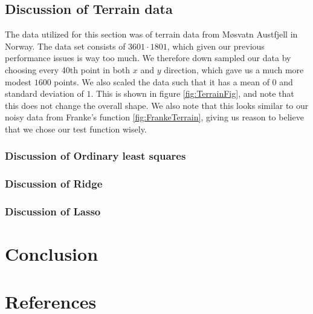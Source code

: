 \documentclass{article}
\begin{document}
\subsection{Discussion of Terrain data}
The data utilized for this section was of terrain data from Møsvatn Austfjell in Norway. The data set consists of $3601 \cdot 1801$, which given our previous performance issues is way too much. We therefore down sampled our data by choosing every 40th point in both $x$ and $y$ direction, which gave us a much more modest $1600$ points. We also scaled the data such that it has a mean of $0$ and standard deviation of $1$. This is shown in figure \ref{fig:TerrainFig}, and note that this does not change the overall shape. We also note that this looks similar to our noisy data from Franke's function \ref{fig:FrankeTerrain}, giving us reason to believe that we chose our test function wisely.

\subsubsection{Discussion of Ordinary least squares}


\subsubsection{Discussion of Ridge}
\subsubsection{Discussion of Lasso}

\section{Conclusion}

\section{References}

\end{document}

